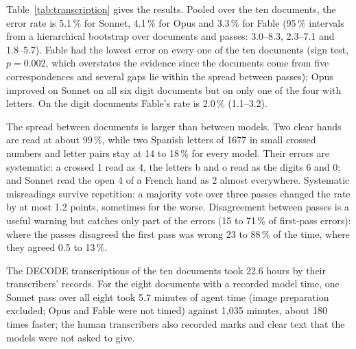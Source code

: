 \documentclass[11pt]{article}
\begin{document}
Table~\ref{tab:transcription} gives the results. Pooled over the ten documents, the error rate is 5.1\,\% for Sonnet, 4.1\,\% for Opus and 3.3\,\% for Fable (95\,\% intervals from a hierarchical bootstrap over documents and passes: 3.0--8.3, 2.3--7.1 and 1.8--5.7). Fable had the lowest error on every one of the ten documents (sign test, $p=0.002$, which overstates the evidence since the documents come from five correspondences and several gaps lie within the spread between passes); Opus improved on Sonnet on all six digit documents but on only one of the four with letters. On the digit documents Fable's rate is 2.0\,\% (1.1--3.2).

The spread between documents is larger than between models. Two clear hands are read at about 99\,\%, while two Spanish letters of 1677 in small crossed numbers and letter pairs stay at 14 to 18\,\% for every model. Their errors are systematic: a crossed 1 read as 4, the letters b and o read as the digits 6 and 0; and Sonnet read the open 4 of a French hand as 2 almost everywhere. Systematic misreadings survive repetition: a majority vote over three passes changed the rate by at most 1.2 points, sometimes for the worse. Disagreement between passes is a useful warning but catches only part of the errors (15 to 71\,\% of first-pass errors): where the passes disagreed the first pass was wrong 23 to 88\,\% of the time, where they agreed 0.5 to 13\,\%.

The DECODE transcriptions of the ten documents took 22.6 hours by their transcribers' records. For the eight documents with a recorded model time, one Sonnet pass over all eight took 5.7 minutes of agent time (image preparation excluded; Opus and Fable were not timed) against 1,035 minutes, about 180 times faster; the human transcribers also recorded marks and clear text that the models were not asked to give.
\end{document}
